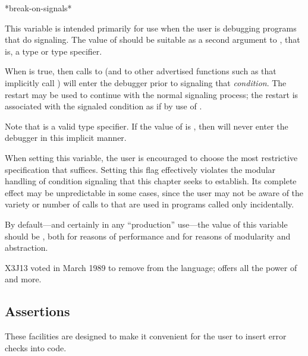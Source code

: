 \begin{defun}[Variable]
*break-on-signals*

  This variable is intended primarily for use when the user is debugging
  programs that do signaling.
  The value of  should be suitable as a second argument to
  , that is, a type or type specifier.

  When  is true, then calls to
   (and to other advertised functions such as  that
  implicitly call ) will enter the debugger prior to signaling
  that \emph{condition}. The  restart may be used to continue with
  the normal signaling process;
the restart is associated with the signaled condition as if by
use of .

  Note that  is a valid type specifier.  If the value of
   is , then  will never
  enter the debugger in this implicit manner.

  When setting this variable, the user is encouraged to choose the
  most restrictive specification that suffices. Setting this flag
  effectively violates the modular handling of condition signaling
  that this chapter seeks to establish. Its complete effect may be
  unpredictable in some cases, since the user may not be aware of the
  variety or number of calls to  that are used in programs
  called only incidentally.

  By default---and certainly in any ``production'' use---the value
  of this variable should be , both for reasons of performance and
  for reasons of modularity and abstraction.

\begin{newer}
X3J13 voted in March 1989
to remove  from the language;
 offers all the power of
   and more.
\end{newer}
\end{defun}


\subsection{Assertions}
\label{CONDITION-ASSERTIONS}


These facilities are designed to make it convenient for the user
to insert error checks into code.

